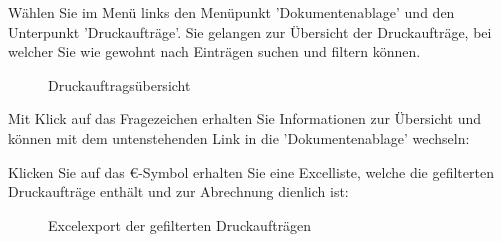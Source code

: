 Wählen Sie im Menü links den Menüpunkt 'Dokumentenablage' und den Unterpunkt 'Druckaufträge'. Sie gelangen zur Übersicht der Druckaufträge, bei welcher Sie wie gewohnt nach Einträgen suchen und filtern können.

\vspace{4cm} 

\begin{figure}[H]
\caption{Druckauftragsübersicht}
\end{figure}

Mit Klick auf das Fragezeichen  erhalten Sie Informationen zur Übersicht und können mit dem untenstehenden Link in die 'Dokumentenablage' wechseln:

\begin{figure}[H]
\end{figure}

Klicken Sie auf das \euro{-Symbol}  erhalten Sie eine Excelliste, welche die gefilterten Druckaufträge enthält und zur Abrechnung dienlich ist:

\begin{figure}[H]
\caption{Excelexport der gefilterten Druckaufträgen}
\end{figure}

